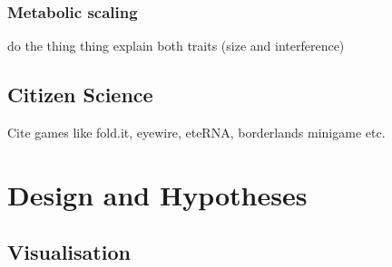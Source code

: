 \subsubsection{Metabolic scaling}
do the thing thing
explain both traits (size and interference)

\subsection{Citizen Science}
Cite games like fold.it, eyewire, eteRNA, borderlands minigame etc.

\section{Design and Hypotheses}
\subsection{Visualisation}
